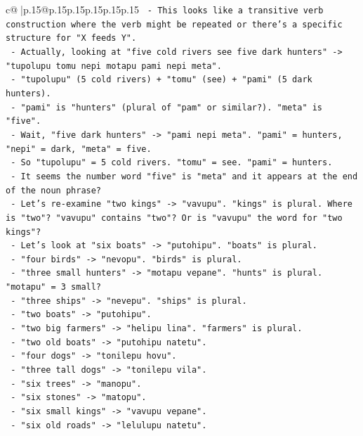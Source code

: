 \documentclass{article}
\begin{document}
{\begin{supertabular}{c@{$\;$}|p{.15\linewidth}@{}p{.15\linewidth}p{.15\linewidth}p{.15\linewidth}p{.15\linewidth}p{.15\linewidth}}
{{{\texttt{      {-} This looks like a transitive verb construction where the verb might be repeated or there's a specific structure for "X feeds Y".} \\
\texttt{      {-} Actually, looking at "five cold rivers see five dark hunters" {-}> "tupolupu tomu nepi motapu pami nepi meta".} \\
\texttt{        {-} "tupolupu" (5 cold rivers) + "tomu" (see) + "pami" (5 dark hunters).} \\
\texttt{        {-} "pami" is "hunters" (plural of "pam" or similar?). "meta" is "five".} \\
\texttt{        {-} Wait, "five dark hunters" {-}> "pami nepi meta". "pami" = hunters, "nepi" = dark, "meta" = five.} \\
\texttt{        {-} So "tupolupu" = 5 cold rivers. "tomu" = see. "pami" = hunters.} \\
\texttt{        {-} It seems the number word "five" is "meta" and it appears at the end of the noun phrase?} \\
\texttt{        {-} Let's re{-}examine "two kings" {-}> "vavupu". "kings" is plural. Where is "two"? "vavupu" contains "two"? Or is "vavupu" the word for "two kings"?} \\
\texttt{        {-} Let's look at "six boats" {-}> "putohipu". "boats" is plural.} \\
\texttt{        {-} "four birds" {-}> "nevopu". "birds" is plural.} \\
\texttt{        {-} "three small hunters" {-}> "motapu vepane". "hunts" is plural. "motapu" = 3 small?} \\
\texttt{        {-} "three ships" {-}> "nevepu". "ships" is plural.} \\
\texttt{        {-} "two boats" {-}> "putohipu".} \\
\texttt{        {-} "two big farmers" {-}> "helipu lina". "farmers" is plural.} \\
\texttt{        {-} "two old boats" {-}> "putohipu natetu".} \\
\texttt{        {-} "four dogs" {-}> "tonilepu hovu".} \\
\texttt{        {-} "three tall dogs" {-}> "tonilepu vila".} \\
\texttt{        {-} "six trees" {-}> "manopu".} \\
\texttt{        {-} "six stones" {-}> "matopu".} \\
\texttt{        {-} "six small kings" {-}> "vavupu vepane".} \\
\texttt{        {-} "six old roads" {-}> "lelulupu natetu".} \\
}}}
\end{supertabular}}
\end{document}

